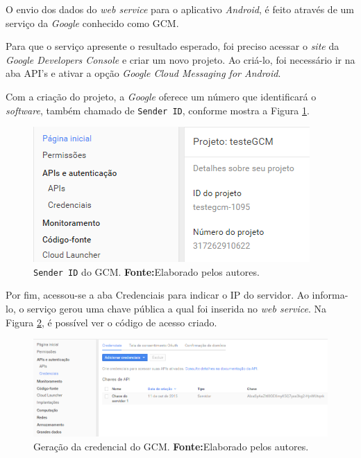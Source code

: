 
	\par O envio dos dados do \textit{web service} para o aplicativo
\textit{Android}, é feito através de um serviço da \textit{Google} conhecido
como GCM.

	\par Para que o serviço apresente o resultado esperado, foi preciso acessar o
\textit{site} da \textit{Google Developers Console} e criar um novo projeto. Ao
criá-lo, foi necessário ir na aba API's e ativar a opção \textit{Google Cloud
Messaging for Android}.

 	\par Com a criação do projeto, a \textit{Google} oferece um número que
identificará o \textit{software}, também chamado de \texttt{Sender ID},
conforme mostra a Figura \ref{fig:gcm}.


	\begin{figure}[h!] 
		\centerline{\includegraphics[scale=0.7]{./imagens/2_q_metodologico/4_procedimentos_resultados/41_gcm/gcm.png}}
		\caption[\texttt{Sender ID} do GCM]{\texttt{Sender ID} do GCM.
		\textbf{Fonte:}Elaborado pelos autores.}
		\label{fig:gcm}
	\end{figure}
	\pagebreak
	
	\par Por fim, acessou-se a aba Credenciais para indicar o IP do servidor. Ao
informa-lo, o serviço gerou uma chave pública a qual foi inserida no
\textit{web service}. Na Figura \ref{fig:gcm1}, é possível ver o código de
acesso criado.


	\begin{figure}[h!] 
		\centerline{\includegraphics[scale=0.45]{./imagens/2_q_metodologico/4_procedimentos_resultados/41_gcm/gcm1.png}}
		\caption[Geração da credencial do GCM]{Geração da credencial do GCM.
		\textbf{Fonte:}Elaborado pelos autores.}
		\label{fig:gcm1}
	\end{figure}